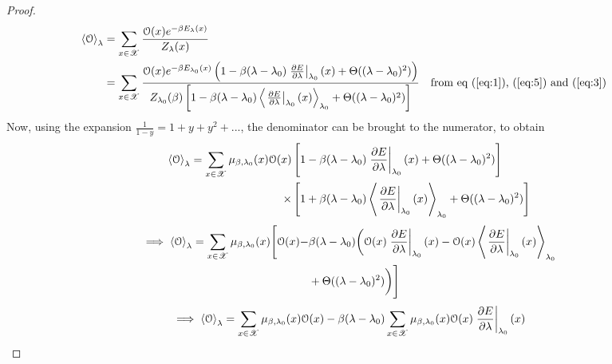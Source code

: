 \documentclass[letterpaper,english,10pt]{article}
\begin{document}
\begin{proof}
\begin{align}
\left\langle \mathcal{O} \right\rangle_{\lambda} &= \sum_{x \in \mathscr{X}} \frac{\mathcal{O}(x) e^{-\beta E_\lambda(x)}}{Z_\lambda(x)} \nonumber \\
	&= \sum_{x \in \mathscr{X}} \frac{\mathcal{O}(x) e^{-\beta E_{\lambda_0}(x)}\left( 1 - \beta (\lambda - \lambda_0) \left. \frac{\partial E}{\partial \lambda} \right|_{\lambda_0}(x) + \Theta((\lambda - \lambda_0)^2) \right)}{Z_{\lambda_0}(\beta) \left[ 1 - \beta (\lambda - \lambda_0) \left\langle \left. \frac{\partial E}{\partial \lambda} \right|_{\lambda_0}(x) \right\rangle_{\lambda_0} + \Theta((\lambda - \lambda_0)^2) \right]} \nonumber &&\text{from eq (\ref{eq:1}), (\ref{eq:5}) and (\ref{eq:3})}
\end{align}
Now, using the expansion $\frac{1}{1-y} = 1 + y + y^2 + ...$, the denominator can be brought to the numerator, to obtain
\begin{equation}
\begin{aligned}
\left\langle \mathcal{O} \right\rangle_{\lambda} = \sum_{x \in \mathscr{X}} \mu_{\beta,\lambda_0}(x)\mathcal{O}(x)
	&\left[ 1 - \beta (\lambda - \lambda_0) \left. \frac{\partial E}{\partial \lambda} \right|_{\lambda_0}(x) + \Theta((\lambda - \lambda_0)^2) \right]\\
	\times &\left[ 1 + \beta (\lambda - \lambda_0) \left\langle \left. \frac{\partial E}{\partial \lambda} \right|_{\lambda_0}(x) \right\rangle_{\lambda_0} + \Theta((\lambda - \lambda_0)^2) \right]
\end{aligned} \nonumber
\end{equation}
\begin{equation}
\begin{aligned}
\implies \left\langle \mathcal{O} \right\rangle_{\lambda} = \sum_{x \in \mathscr{X}} \mu_{\beta,\lambda_0}(x)
	\Bigg[
	\mathcal{O}(x) - & \beta(\lambda - \lambda_0) \bigg( \mathcal{O}(x) \left. \frac{\partial E}{\partial \lambda} \right|_{\lambda_0}(x) - \mathcal{O}(x) \left\langle \left. \frac{\partial E}{\partial \lambda} \right|_{\lambda_0}(x) \right\rangle_{\lambda_0} \\
	& + \Theta((\lambda - \lambda_0)^2) \bigg)
	\Bigg]
\end{aligned}
\end{equation}
\begin{align}
\implies \left\langle \mathcal{O} \right\rangle_{\lambda} = \sum_{x \in \sX} \mu_{\beta,\lambda_0}(x) \mathcal{O}(x) & -
\beta (\lambda - \lambda_0)\sum_{x \in \sX} \mu_{\beta,\lambda_0}(x) \mathcal{O}(x) \left. \frac{\partial E}{\partial \lambda} \right|_{\lambda_0}(x) \nonumber \\

\end{align}
\end{proof}
\end{document}
